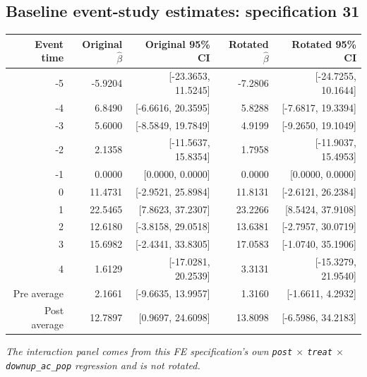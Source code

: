 \documentclass[10pt]{article}
\begin{document}
\subsection*{Baseline event-study estimates: specification 31}
\begin{center}
\scriptsize
\begin{tabular}{r rr rr}
\toprule
Event time & Original $\hat\beta$ & Original 95\% CI & Rotated $\hat\beta$ & Rotated 95\% CI \\
\midrule
-5 & -5.9204 & [-23.3653, 11.5245] & -7.2806 & [-24.7255, 10.1644] \\
-4 & 6.8490 & [-6.6616, 20.3595] & 5.8288 & [-7.6817, 19.3394] \\
-3 & 5.6000 & [-8.5849, 19.7849] & 4.9199 & [-9.2650, 19.1049] \\
-2 & 2.1358 & [-11.5637, 15.8354] & 1.7958 & [-11.9037, 15.4953] \\
-1 & 0.0000 & [0.0000, 0.0000] & 0.0000 & [0.0000, 0.0000] \\
0 & 11.4731 & [-2.9521, 25.8984] & 11.8131 & [-2.6121, 26.2384] \\
1 & 22.5465 & [7.8623, 37.2307] & 23.2266 & [8.5424, 37.9108] \\
2 & 12.6180 & [-3.8158, 29.0518] & 13.6381 & [-2.7957, 30.0719] \\
3 & 15.6982 & [-2.4341, 33.8305] & 17.0583 & [-1.0740, 35.1906] \\
4 & 1.6129 & [-17.0281, 20.2539] & 3.3131 & [-15.3279, 21.9540] \\
\midrule
Pre average & 2.1661 & [-9.6635, 13.9957] & 1.3160 & [-1.6611, 4.2932] \\
Post average & 12.7897 & [0.9697, 24.6098] & 13.8098 & [-6.5986, 34.2183] \\
\bottomrule
\end{tabular}
\end{center}
\medskip
\textit{The interaction panel comes from this FE specification's own \texttt{post} $\times$ \texttt{treat} $\times$ \texttt{downup\_ac\_pop} regression and is not rotated.}
\clearpage
\end{document}
